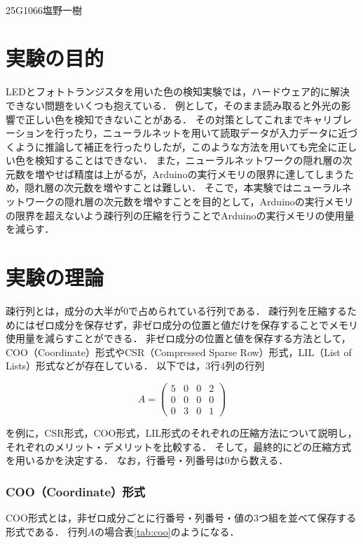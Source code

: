 \documentclass[a4paper,11pt,uplatex,dvipdfmx]{jsarticle}
\begin{document}
\\[0.4em]
25G1066\quad 塩野一樹
\bigskip

\section{実験の目的}
LEDとフォトトランジスタを用いた色の検知実験では，ハードウェア的に解決できない問題をいくつも抱えている．
例として，そのまま読み取ると外光の影響で正しい色を検知できないことがある．
その対策としてこれまでキャリブレーションを行ったり，ニューラルネットを用いて読取データが入力データに近づくように推論して補正を行ったりしたが，このような方法を用いても完全に正しい色を検知することはできない．
また，ニューラルネットワークの隠れ層の次元数を増やせば精度は上がるが，Arduinoの実行メモリの限界に達してしまうため，隠れ層の次元数を増やすことは難しい．
そこで，本実験ではニューラルネットワークの隠れ層の次元数を増やすことを目的として，Arduinoの実行メモリの限界を超えないよう疎行列の圧縮を行うことでArduinoの実行メモリの使用量を減らす．

\section{実験の理論}
疎行列とは，成分の大半が0で占められている行列である．
疎行列を圧縮するためにはゼロ成分を保存せず，非ゼロ成分の位置と値だけを保存することでメモリ使用量を減らすことができる．
非ゼロ成分の位置と値を保存する方法として，COO（Coordinate）形式やCSR（Compressed Sparse Row）形式，LIL（List of Lists）形式などが存在している．
以下では，3行4列の行列

\begin{equation}
  A =
  \begin{pmatrix}
    5 & 0 & 0 & 2 \\
    0 & 0 & 0 & 0 \\
    0 & 3 & 0 & 1
  \end{pmatrix}
\end{equation}

を例に，CSR形式，COO形式，LIL形式のそれぞれの圧縮方法について説明し，それぞれのメリット・デメリットを比較する．
そして，最終的にどの圧縮方式を用いるかを決定する．
なお，行番号・列番号は0から数える．

\subsubsection{COO（Coordinate）形式}

COO形式とは，非ゼロ成分ごとに行番号・列番号・値の3つ組を並べて保存する形式である．
行列$A$の場合表\ref{tab:coo}のようになる．
\end{document}
